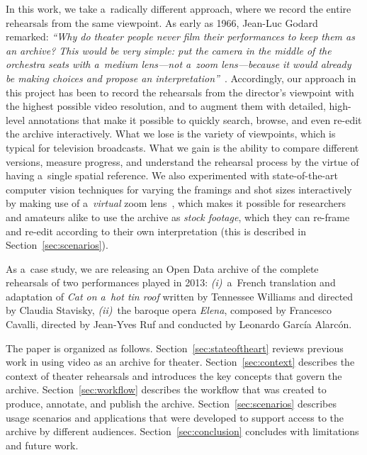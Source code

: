 \documentclass[conference]{IEEEtran}
\begin{document}
In this work, we take a~radically different approach, where we record the entire rehearsals from the same viewpoint.  As early as 1966, Jean-Luc Godard remarked: {\em ``Why do theater people never film their performances to keep  them as an archive? This would be very simple: put the camera in the middle of the orchestra seats with a~medium lens---not a~zoom lens---because it would already be making choices and propose an interpretation''}~\cite{Godard66}. Accordingly, our approach in this project has been to record the rehearsals from the director's viewpoint  with the highest possible video resolution, and to augment them with detailed, high-level  annotations that make it possible to quickly  search, browse, and even re-edit the archive interactively. What we lose is the variety of viewpoints, which is typical for television broadcasts. What we gain is the ability to compare different versions, measure progress, and understand the rehearsal process by the virtue of having a~single spatial reference. We also experimented with state-of-the-art computer vision techniques for varying the framings and shot sizes interactively  by making use of a~{\em virtual}  zoom lens~\cite{Gandhi14}, which makes it possible for researchers and amateurs alike to use the archive as {\em stock footage}, which they can re-frame and re-edit according to their own interpretation (this is described in Section~\ref{sec:scenarios}). 

As a~case study, we are releasing an Open Data archive of the complete rehearsals of two performances played in 2013: \emph{(i)}~a~French translation and adaptation of \emph{Cat on a~hot tin roof} written by Tennessee Williams and directed by Claudia Stavisky, \emph{(ii)}~the baroque opera \emph{Elena}, composed by Francesco Cavalli, directed by Jean-Yves Ruf and conducted by Leonardo García Alarcón.



The paper is organized as follows. Section~\ref{sec:stateoftheart} reviews previous work in using video as an archive for theater. Section~\ref{sec:context} describes the context of theater rehearsals and introduces the key concepts that govern the archive. Section~\ref{sec:workflow} describes the workflow that was created to produce, annotate, and publish the archive. Section~\ref{sec:scenarios} describes usage scenarios and applications that were developed to support access to the archive by different audiences. Section~\ref{sec:conclusion} concludes with limitations and future work.
\end{document}
